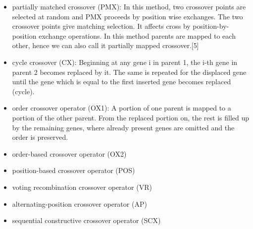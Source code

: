 \documentclass[a4paper, 12pt]{article}
\begin{document}
\begin{itemize}
\item  partially matched crossover (PMX): In this method, two crossover points are selected at random and PMX proceeds by position wise exchanges. The two crossover points give matching selection. It affects cross by position-by-position exchange operations. In this method parents are mapped to each other, hence we can also call it partially mapped crossover.[5]
\item  cycle crossover (CX): Beginning at any gene i in parent 1, the i-th gene in parent 2 becomes replaced by it. The same is repeated for the displaced gene until the gene which is equal to the first inserted gene becomes replaced (cycle).
\item  order crossover operator (OX1): A portion of one parent is mapped to a portion of the other parent. From the replaced portion on, the rest is filled up by the remaining genes, where already present genes are omitted and the order is preserved.
\item order-based crossover operator (OX2)
\item position-based crossover operator (POS)
\item voting recombination crossover operator (VR)
\item alternating-position crossover operator (AP)
\item sequential constructive crossover operator (SCX)
\end{itemize}
\end{document}
